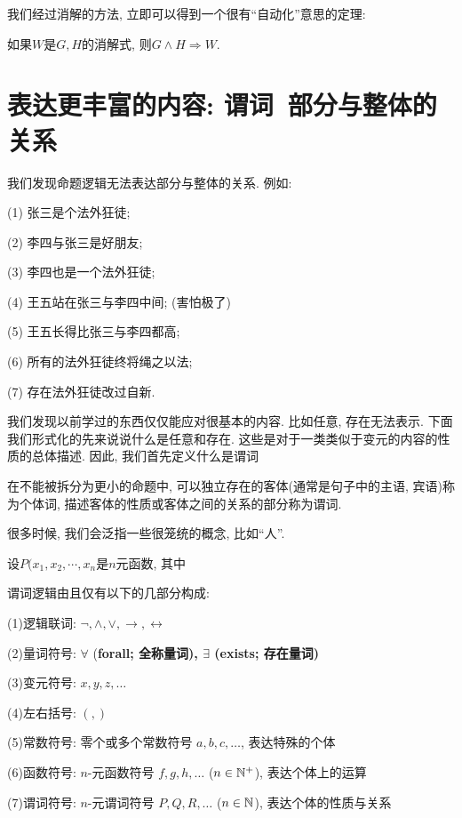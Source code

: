 我们经过消解的方法, 立即可以得到一个很有``自动化''意思的定理: 

\begin{theorem}
	如果$W$是$G,H$的消解式, 则$G\land H\Rightarrow W$. 
\end{theorem}

\section{表达更丰富的内容: 谓词~部分与整体的关系}

我们发现命题逻辑无法表达部分与整体的关系. 例如: 

\begin{example}
	(1) 张三是个法外狂徒; 
	
	(2) 李四与张三是好朋友;
	
	(3) 李四也是一个法外狂徒;
	
	(4) 王五站在张三与李四中间; (害怕极了)
	
	(5) 王五长得比张三与李四都高;
	
	(6) 所有的法外狂徒终将绳之以法;
	
	(7) 存在法外狂徒改过自新. 
\end{example}


我们发现以前学过的东西仅仅能应对很基本的内容. 比如任意, 存在无法表示. 下面我们形式化的先来说说什么是任意和存在. 这些是对于一类类似于变元的内容的性质的总体描述. 因此,  我们首先定义什么是谓词

\begin{definition}[谓词]
	在不能被拆分为更小的命题中, 可以独立存在的客体(通常是句子中的主语, 宾语)称为个体词, 描述客体的性质或客体之间的关系的部分称为谓词. 
\end{definition}

很多时候, 我们会泛指一些很笼统的概念, 比如``人''. 

\begin{definition}[$n$元命题函数]
	设$P(x_1,x_2,\cdots,x_n$是$n$元函数, 其中
\end{definition}

\begin{definition}[谓词逻辑的构成] 谓词逻辑由且仅有以下的几部分构成: 

      (1)逻辑联词: $\lnot, \land, \lor, \to, \leftrightarrow$
      
      (2)量词符号:  $\forall$ (\bf{forall}; 全称量词),
        $\exists$ (\bf{exists}; 存在量词)
      
      (3)变元符号: $x, y, z, \dots$
      
      (4)左右括号: $(, )$
      
      (5)常数符号: 零个或多个常数符号 $a, b, c, \dots$, 表达特殊的个体
      
      (6)函数符号: $n$-元函数符号 $f, g, h, \dots$ ($n \in \mathbb{N}^{+}$), 表达个体上的运算
      
      (7)谓词符号:  $n$-元谓词符号 $P, Q, R, \dots$ ($n \in \mathbb{N}$), 表达个体的性质与关系
    
\end{definition}



